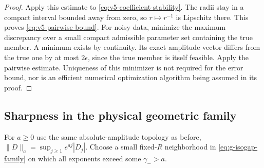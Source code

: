 \begin{proof}
Apply this estimate to \eqref{eq:v5-coefficient-stability}. The radii
stay in a compact interval bounded away from zero, so $r\mapsto r^{-1}$
is Lipschitz there. This proves \eqref{eq:v5-pairwise-bound}. For noisy
data, minimize the maximum discrepancy over a small compact admissible
parameter set containing the true member. A minimum exists by
continuity. Its exact amplitude vector differs from the true one by at
most $2\epsilon$, since the true member is itself feasible. Apply the
pairwise estimate. Uniqueness of this minimizer is not required for the
error bound, nor is an efficient numerical optimization algorithm being
assumed in its proof.
\end{proof}

\subsection{Sharpness in the physical geometric family}
For $a\ge0$ use the same absolute-amplitude topology as before,
$\|D\|_a=\sup_{j\ge1}e^{aj}|D_j|$. Choose a small fixed-$R$
neighborhood in \eqref{eq:g-isogap-family} on which all exponents exceed
some $\gamma_->a$.

